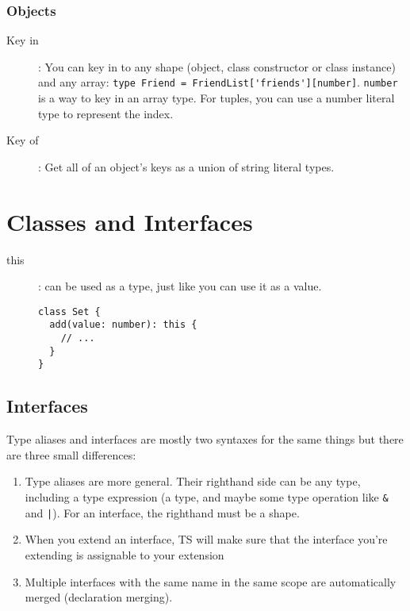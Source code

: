 \documentclass[french]{article}
\begin{document}
\subsubsection*{Objects}

\begin{description}
  \item[Key in]: You can key in to any shape (object, class constructor or class instance) and any array: \lstinline{type Friend = FriendList['friends'][number]}. \lstinline{number} is a way to key in  an array type. For tuples, you can use a number literal type to represent the index.
  \item[Key of]: Get all of an object's keys as a union of string literal types.
\end{description}



\section{Classes and Interfaces}

\begin{description}
  \item[this]: can be used as a type, just like you can use it as a value.

  \begin{lstlisting}
class Set {
  add(value: number): this {
    // ...
  }
}
  \end{lstlisting}
\end{description}

\subsection{Interfaces}

Type aliases and interfaces are mostly two syntaxes for the same things but there are three small differences:

\begin{enumerate}
  \item Type aliases are more general. Their righthand side can be any type, including a type expression (a type, and maybe some type operation like \lstinline{&} and \lstinline{|}). For an interface, the righthand must be a shape.
  \item When you extend an interface, TS will make sure that the interface you're extending is assignable to your extension
  \item Multiple interfaces with the same name in the same scope are automatically merged (declaration merging).
\end{enumerate}
\end{document}
